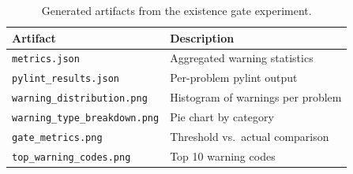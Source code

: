 \begin{table}[h]
\centering
\caption{Generated artifacts from the existence gate experiment.}
\label{tab:artifacts}
\begin{tabular}{@{}ll@{}}
\toprule
Artifact & Description \\
\midrule
\texttt{metrics.json} & Aggregated warning statistics \\
\texttt{pylint\_results.json} & Per-problem pylint output \\
\texttt{warning\_distribution.png} & Histogram of warnings per problem \\
\texttt{warning\_type\_breakdown.png} & Pie chart by category \\
\texttt{gate\_metrics.png} & Threshold vs.\ actual comparison \\
\texttt{top\_warning\_codes.png} & Top 10 warning codes \\
\bottomrule
\end{tabular}
\end{table}
